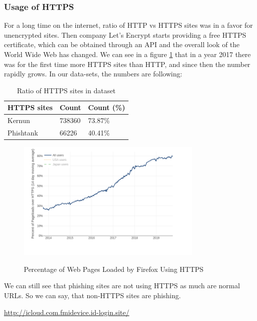 \documentclass[
  digital, %
  oneside, %
  table,   %
  nolof,     %
  nolot,     %
]{fithesis3}
\newcounter{feature}
\newenvironment{feature}[1]{\stepcounter{feature}%
    \tcolorbox[beamer,%
    noparskip,breakable,
    colback=LightBlue,colframe=DarkBlue,%
    colbacklower=DarkBlue!75!LightBlue,%
    title=Feature~\thefeature: #1]}%
    {\endtcolorbox}
\begin{document}
\subsubsection{Usage of HTTPS \cite{methodical-overview} \cite{url-features-work}}

For a long time on the internet, ratio of HTTP vs HTTPS sites was in a favor for unencrypted sites. Then company Let's Encrypt starts providing a free HTTPS certificate, which can be obtained through an API and the overall look of the World Wide Web has changed. We can see in a figure \ref{fig:https-firefox} that in a year 2017 there was for the first time more HTTPS sites than HTTP, and since then the number rapidly grows. In our data-sets, the numbers are following:

\begin{table}[h!]
\begin{tabular}{l|ll}
HTTPS sites & Count  & Count (\%) \\ \hline
Kernun      & 738360 & 73.87\%    \\
Phishtank   & 66226  & 40.41\%   
\end{tabular}
\caption{Ratio of HTTPS sites in dataset}
\label{table:https-sites}
\end{table}

\begin{figure}[]
  \caption{Percentage of Web Pages Loaded by Firefox Using HTTPS}
  \centering
  \includegraphics[width=0.8\textwidth]{images/https-firefox.png}
  \label{fig:https-firefox}
\end{figure}

We can still see that phishing sites are not using HTTPS as much are normal URLs. So we can say, that non-HTTPS sites are phishing.

\begin{feature}{Missing HTTPS}
\url{http://icloud.com.fmidevice.id-login.site/}
\end{feature}
\end{document}
